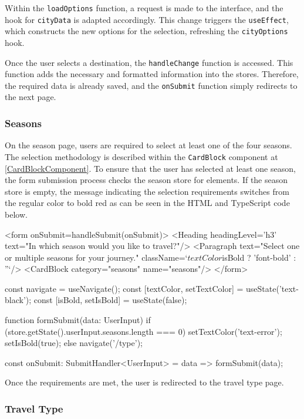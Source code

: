 \documentclass[english,notitlepage,smartquotes]{hgbreport}
\begin{document}
Within the \texttt{loadOptions} function, a request is made to the interface, and the hook for \texttt{cityData} is adapted accordingly. This change triggers the \texttt{useEffect}, which constructs the new options for the selection, refreshing the \texttt{cityOptions} hook.

Once the user selects a destination, the \texttt{handleChange} function is accessed. This function adds the necessary and formatted information into the stores. Therefore, the required data is already saved, and the \texttt{onSubmit} function simply redirects to the next page.

\subsubsection{Seasons}

On the season page, users are required to select at least one of the four seasons. The selection methodology is described within the \texttt{CardBlock} component at \ref{CardBlockComponent}. To ensure that the user has selected at least one season, the form submission process checks the season store for elements. If the season store is empty, the message indicating the selection requirements switches from the regular color to bold red as can be seen in the HTML and TypeScript code below.

\begin{HtmlCode}
<form onSubmit={handleSubmit(onSubmit)}>
	<Heading headingLevel='h3' text="In which season would you like to travel?"/>
	<Paragraph text="Select one or multiple seasons for your journey." 
		className={`${textColor} ${isBold ? 'font-bold' : ''}`}/>
	<CardBlock category="seasons" name="seasons"/>
</form>
\end{HtmlCode}


\begin{JsCode}
const navigate = useNavigate();
const [textColor, setTextColor] = useState('text-black');
const [isBold, setIsBold] = useState(false);

function formSubmit(data: UserInput) {
	if (store.getState().userInput.seasons.length === 0) {
		setTextColor('text-error');
		setIsBold(true);
	} else {
		navigate('/type');
	}
}

const onSubmit: SubmitHandler<UserInput> = data => formSubmit(data);	
\end{JsCode}


Once the requirements are met, the user is redirected to the travel type page.

\subsubsection{Travel Type}
\end{document}
